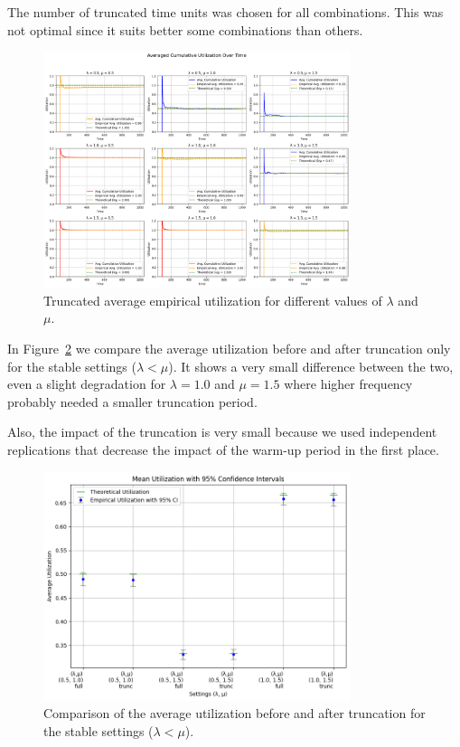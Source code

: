 \documentclass[a4paper]{article}
\begin{document}
The number of truncated time units was chosen for all combinations. This was not optimal since it suits better some combinations than others.

\begin{figure}[htbp]
  \centering
  \includegraphics[width=0.8\textwidth]{images/ex1_p2_trunc_util.png}
  \caption{
    Truncated average empirical utilization for different values of $\lambda$ and $\mu$.
  }\label{fig:e1p2-trunc-util}
\end{figure}

In Figure~\ref{fig:e1p2-compare} we compare the average utilization before and after truncation only for the stable settings ($\lambda < \mu$). It shows a very small difference between the two, even a slight degradation for $\lambda = 1.0$ and $\mu = 1.5$ where higher frequency probably needed a smaller truncation period.

Also, the impact of the truncation is very small because we used independent replications that decrease the impact of the warm-up period in the first place.

\begin{figure}[htbp]
  \centering
  \includegraphics[width=0.8\textwidth]{images/ex1_p2_compare.png}
  \caption{
    Comparison of the average utilization before and after truncation for the stable settings ($\lambda < \mu$).
  }\label{fig:e1p2-compare}
\end{figure}
\end{document}
